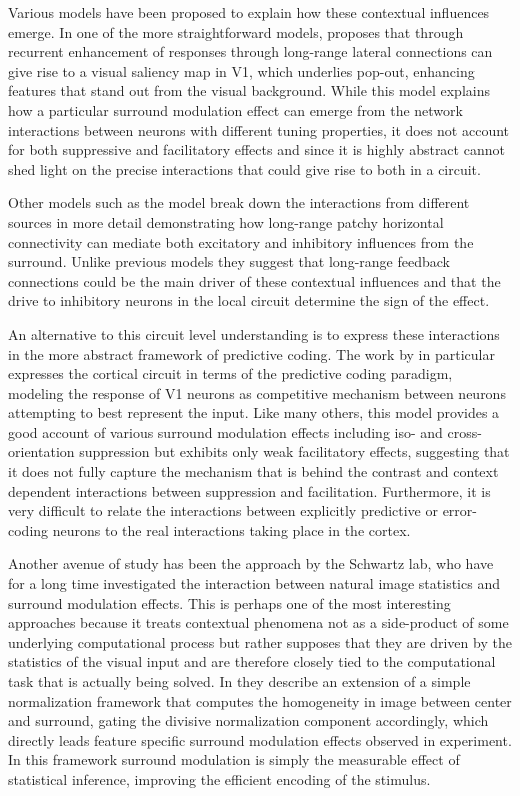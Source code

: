 Various models have been proposed to explain how these contextual
influences emerge. In one of the more straightforward models,
\cite{Li2002} proposes that through recurrent enhancement of responses
through long-range lateral connections can give rise to a visual
saliency map in V1, which underlies pop-out, enhancing features that
stand out from the visual background. While this model explains how a
particular surround modulation effect can emerge from the network
interactions between neurons with different tuning properties, it does
not account for both suppressive and facilitatory effects and since it
is highly abstract cannot shed light on the precise interactions that
could give rise to both in a circuit.

Other models such as the \cite{Schwabe2006} model break down the
interactions from different sources in more detail demonstrating how
long-range patchy horizontal connectivity can mediate both excitatory
and inhibitory influences from the surround. Unlike previous models
they suggest that long-range feedback connections could be the main
driver of these contextual influences and that the drive to inhibitory
neurons in the local circuit determine the sign of the effect.

An alternative to this circuit level understanding is to express these
interactions in the more abstract framework of predictive coding. The
work by \cite{Spratling2010} in particular expresses the cortical
circuit in terms of the predictive coding paradigm, modeling the
response of V1 neurons as competitive mechanism between neurons
attempting to best represent the input. Like many others, this model
provides a good account of various surround modulation effects
including iso- and cross-orientation suppression but exhibits only
weak facilitatory effects, suggesting that it does not fully capture
the mechanism that is behind the contrast and context dependent
interactions between suppression and facilitation. Furthermore, it is
very difficult to relate the interactions between explicitly
predictive or error-coding neurons to the real interactions taking
place in the cortex.

Another avenue of study has been the approach by the Schwartz lab, who
have for a long time investigated the interaction between natural
image statistics and surround modulation effects. This is perhaps one
of the most interesting approaches because it treats contextual
phenomena not as a side-product of some underlying computational
process but rather supposes that they are driven by the statistics of
the visual input and are therefore closely tied to the computational
task that is actually being solved. In \cite{Coen2015} they describe
an extension of a simple normalization framework that computes the
homogeneity in image between center and surround, gating the divisive
normalization component accordingly, which directly leads feature
specific surround modulation effects observed in experiment. In this
framework surround modulation is simply the measurable effect of
statistical inference, improving the efficient encoding of the
stimulus.

